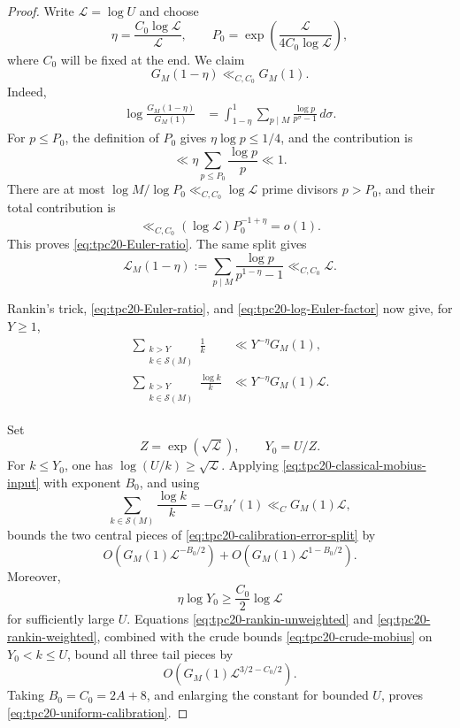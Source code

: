 \begin{proof}
Write \(\mathscr L=\log U\) and choose
\begin{equation}
 \eta=\frac{C_0\log\mathscr L}{\mathscr L},
 \qquad
 P_0=\exp\!\left(\frac{\mathscr L}
 {4C_0\log\mathscr L}\right),
 \label{eq:tpc20-rankin-parameters}
\end{equation}
where \(C_0\) will be fixed at the end.  We claim
\begin{equation}
 G_M(1-\eta)\ll_{C,C_0}G_M(1).
 \label{eq:tpc20-Euler-ratio}
\end{equation}
Indeed,
\begin{align*}
 \log\frac{G_M(1-\eta)}{G_M(1)}
 &=
 \int_{1-\eta}^{1}
 \sum_{p\mid M}\frac{\log p}{p^\sigma-1}\,d\sigma.
\end{align*}
For \(p\le P_0\), the definition of \(P_0\) gives
\(\eta\log p\le1/4\), and the contribution is
\[
 \ll\eta\sum_{p\le P_0}\frac{\log p}{p}\ll1.
\]
There are at most
\(\log M/\log P_0\ll_{C,C_0}\log\mathscr L\) prime divisors
\(p>P_0\), and their total contribution is
\[
 \ll_{C,C_0}(\log\mathscr L)P_0^{-1+\eta}=o(1).
\]
This proves \eqref{eq:tpc20-Euler-ratio}.  The same split gives
\begin{equation}
 \mathcal L_M(1-\eta)
 :=\sum_{p\mid M}\frac{\log p}{p^{1-\eta}-1}
 \ll_{C,C_0}\mathscr L.
 \label{eq:tpc20-log-Euler-factor}
\end{equation}

Rankin's trick, \eqref{eq:tpc20-Euler-ratio}, and
\eqref{eq:tpc20-log-Euler-factor} now give, for \(Y\ge1\),
\begin{align}
 \sum_{\substack{k>Y\\k\in\mathscr S(M)}}\frac1k
 &\ll Y^{-\eta}G_M(1),
 \label{eq:tpc20-rankin-unweighted}\\
 \sum_{\substack{k>Y\\k\in\mathscr S(M)}}\frac{\log k}{k}
 &\ll Y^{-\eta}G_M(1)\mathscr L.
 \label{eq:tpc20-rankin-weighted}
\end{align}

Set
\[
 Z=\exp(\sqrt{\mathscr L}),\qquad Y_0=U/Z.
\]
For \(k\le Y_0\), one has
\(\log(U/k)\ge\sqrt{\mathscr L}\).  Applying
\eqref{eq:tpc20-classical-mobius-input} with exponent \(B_0\), and using
\[
 \sum_{k\in\mathscr S(M)}\frac{\log k}{k}
 =-G_M'(1)
 \ll_C G_M(1)\mathscr L,
\]
bounds the two central pieces of
\eqref{eq:tpc20-calibration-error-split} by
\begin{equation}
 O\!\left(G_M(1)\mathscr L^{-B_0/2}\right)
 +O\!\left(G_M(1)\mathscr L^{1-B_0/2}\right).
 \label{eq:tpc20-central-calibration-error}
\end{equation}
Moreover,
\[
 \eta\log Y_0\ge\frac{C_0}{2}\log\mathscr L
\]
for sufficiently large \(U\).  Equations
\eqref{eq:tpc20-rankin-unweighted} and
\eqref{eq:tpc20-rankin-weighted}, combined with the crude bounds
\eqref{eq:tpc20-crude-mobius} on \(Y_0<k\le U\), bound all three tail
pieces by
\begin{equation}
 O\!\left(G_M(1)\mathscr L^{3/2-C_0/2}\right).
 \label{eq:tpc20-tail-calibration-error}
\end{equation}
Taking \(B_0=C_0=2A+8\), and enlarging the constant for bounded \(U\),
proves \eqref{eq:tpc20-uniform-calibration}.
\end{proof}

